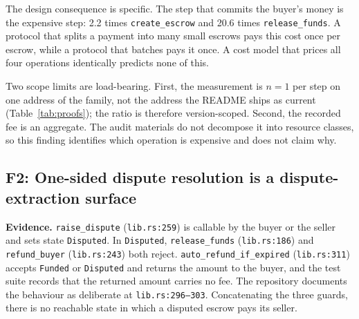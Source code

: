 \documentclass[sigconf,review]{acmart}
\begin{document}
The design consequence is specific. The step that commits the buyer's money is
the expensive step: 2.2 times \texttt{create\_escrow} and 20.6 times
\texttt{release\_funds}. A protocol that splits a payment into many small
escrows pays this cost once per escrow, while a protocol that batches pays it
once. A cost model that prices all four operations identically predicts none of
this.

Two scope limits are load-bearing. First, the measurement is $n=1$ per step on
one address of the family, not the address the README ships as current
(Table~\ref{tab:proofs}); the ratio is therefore version-scoped.
Second, the recorded fee is an aggregate. The audit materials do not
decompose it into resource classes, so this finding identifies which operation
is expensive and does not claim why.



\subsection{F2: One-sided dispute resolution is a dispute-extraction
surface}
\label{f:dispute}

\textbf{Evidence.} \texttt{raise\_dispute} (\texttt{lib.rs:259}) is callable by
the buyer or the seller and sets state \texttt{Disputed}. In
\texttt{Disputed}, \texttt{release\_funds} (\texttt{lib.rs:186}) and
\texttt{refund\_buyer} (\texttt{lib.rs:243}) both reject.
\texttt{auto\_refund\_\allowbreak if\_\allowbreak expired} (\texttt{lib.rs:311}) accepts
\texttt{Funded} or \texttt{Disputed} and returns the amount to the buyer, and
the test suite records that the returned amount carries no fee. The repository
documents the behaviour as deliberate at \texttt{lib.rs:296--303}.
Concatenating the three guards, there is no reachable state in which a
disputed escrow pays its seller.
\end{document}

